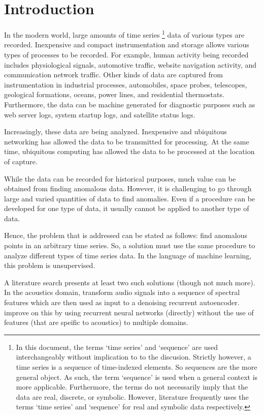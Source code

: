 \chapter[intro]{Introduction}


In the modern world, large amounts of time series \footnote{In this document, the terms `time series' and `sequence' are used interchangeably without implication to to the discusion. Strictly however, a time series is a sequence of time-indexed elements. So sequences are the more general object. As such, the term `sequence' is used when a general context is more applicable. Furthermore, the terms do not necessarily imply that the data are real, discrete, or symbolic. However, literature frequently uses the terms `time series' and `sequence' for real and symbolic data respectively.} data of various types are recorded.  Inexpensive and compact instrumentation and storage allows various types of processes to be recorded. For example, human activity being recorded includes physiological signals, automotive traffic, website navigation activity, and communication network traffic. Other kinds of data are captured from instrumentation in industrial processes, automobiles, space probes, telescopes, geological formations, oceans, power lines, and residential thermostats. Furthermore, the data can be machine generated for diagnostic purposes such as web server logs, system startup logs, and satellite status logs.

Increasingly, these data are being analyzed. Inexpensive and ubiquitous networking has allowed the data to be transmitted for processing. At the same time, ubiquitous computing has allowed the data to be processed at the location of capture.

While the data can be recorded for historical purposes, much value can be obtained from finding anomalous data. However, it is challenging to go through large and varied quantities of data to find anomalies. Even if a procedure can be developed for one type of data, it usually cannot be applied to another type of data.

Hence, the problem that is addressed can be stated as follows: find anomalous points in an arbitrary time series. So, a solution must use the same procedure to analyze different types of time series data. In the language of machine learning, this problem is unsupervised.

A literature search presents at least two such solutions (though not much more). In the acoustics domain, \cite{Marchi2015} transform audio signals into a sequence of spectral features which are then used as input to a denoising recurrent autoencoder. \cite{Malhotra2015} improve on this by using recurrent neural networks (directly) without the use of features (that are speific to acoustics) to multiple domains.


